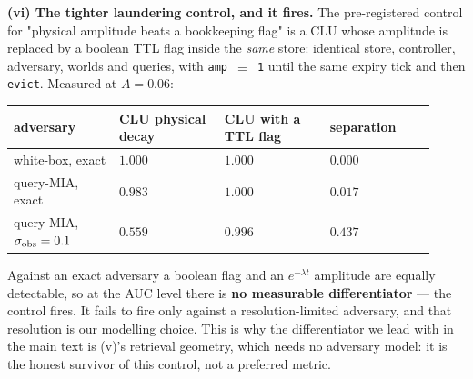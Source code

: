 \documentclass{article}
\begin{document}
\textbf{(vi) The tighter laundering control, and it fires.} The pre-registered control for "physical amplitude beats a bookkeeping flag" is a CLU whose amplitude is replaced by a boolean TTL flag inside the \emph{same} store: identical store, controller, adversary, worlds and queries, with \texttt{amp $\equiv$ 1} until the same expiry tick and then \texttt{evict}. Measured at $A=0.06$:

\begin{table}[t]\centering\small
\begin{tabular}{p{0.23\linewidth}p{0.23\linewidth}p{0.23\linewidth}p{0.23\linewidth}}
\toprule
adversary & CLU physical decay & CLU with a TTL flag & separation \\
\midrule
white-box, exact & $1.000$ & $1.000$ & $0.000$ \\
query-MIA, exact & $0.983$ & $1.000$ & $0.017$ \\
query-MIA, $\sigma_{\rm obs}=0.1$ & $0.559$ & $0.996$ & $0.437$ \\
\bottomrule
\end{tabular}
\end{table}

Against an exact adversary a boolean flag and an $e^{-\lambda t}$ amplitude are equally detectable, so at the AUC level there is \textbf{no measurable differentiator} --- the control fires. It fails to fire only against a resolution-limited adversary, and that resolution is our modelling choice. This is why the differentiator we lead with in the main text is (v)'s retrieval geometry, which needs no adversary model: it is the honest survivor of this control, not a preferred metric.
\end{document}
